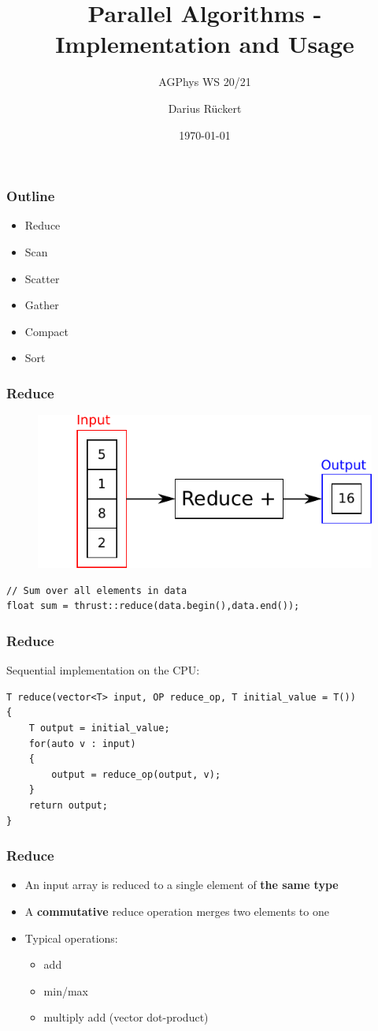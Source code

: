 \documentclass[aspectratio=169,handout]{beamer}
\subtitle{AGPhys WS 20/21}
\title{Parallel Algorithms - Implementation and Usage}
\author[Darius Rückert]{Darius Rückert}
\date{\today}
\begin{document}
\frame
{
	\titlepage
}

\frame
{
\frametitle{Outline}
\begin{itemize}
	\item Reduce 
	\item Scan 
	\item Scatter
	\item Gather
	\item Compact
	\item Sort
\end{itemize}
}



\begin{frame}[fragile]
\frametitle{Reduce}
\begin{figure}
	\centering
	\includegraphics[height=0.6\textheight]{o_reduce}
\end{figure}

\begin{lstlisting}
// Sum over all elements in data
float sum = thrust::reduce(data.begin(),data.end());
\end{lstlisting}
\end{frame}



\begin{frame}[fragile]
	\frametitle{Reduce}
	Sequential implementation on the CPU:
\begin{lstlisting}
T reduce(vector<T> input, OP reduce_op, T initial_value = T())
{
	T output = initial_value;
	for(auto v : input)
	{
		output = reduce_op(output, v);
	}
	return output;
}
\end{lstlisting}
\end{frame}

\frame
{	
	\frametitle{Reduce}
	\begin{itemize}
		\item An input array is reduced to a single element of \textbf{the same type}
		\item<2-> A \textbf{commutative} reduce operation merges two elements to one
		\item<2-> Typical operations:
		\begin{itemize}
			\item add
			\item min/max
			\item multiply add (vector dot-product)
		\end{itemize}
	\end{itemize}
}
\end{document}
